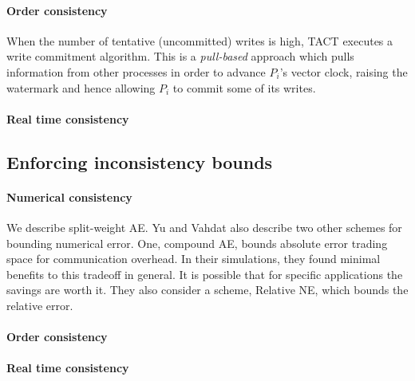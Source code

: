 \documentclass[]             %
{NASA}                       %
\theoremstyle{definition}
\begin{document}
\hypertarget{order-consistency}{%
  \paragraph{Order consistency}\label{order-consistency}}

When the number of tentative (uncommitted) writes is high, TACT executes
a write commitment algorithm. This is a \emph{pull-based} approach which
pulls information from other processes in order to advance \(P_i\)'s
vector clock, raising the watermark and hence allowing \(P_i\) to commit
some of its writes.

\hypertarget{real-time-consistency}{%
  \paragraph{Real time consistency}\label{real-time-consistency}}

\hypertarget{enforcing-inconsistency-bounds}{%
  \subsection{Enforcing inconsistency
    bounds}\label{enforcing-inconsistency-bounds}}

\hypertarget{numerical-consistency-1}{%
  \paragraph{Numerical consistency}\label{numerical-consistency-1}}

We describe split-weight AE. Yu and Vahdat also describe two other
schemes for bounding numerical error. One, compound AE, bounds absolute
error trading space for communication overhead. In their simulations,
they found minimal benefits to this tradeoff in general. It is possible
that for specific applications the savings are worth it. They also
consider a scheme, Relative NE, which bounds the relative error.

\hypertarget{order-consistency-1}{%
  \paragraph{Order consistency}\label{order-consistency-1}}

\hypertarget{real-time-consistency-1}{%
  \paragraph{Real time consistency}\label{real-time-consistency-1}}
\end{document}
